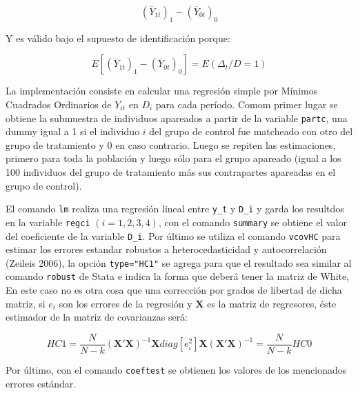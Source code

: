 \documentclass[]{article}
\begin{document}
\[ \left(\overline{Y}_{1t}\right)_{1}-\left(\overline{Y}_{0t}\right)_{0} \]

Y es válido bajo el supuesto de identificación porque:

\[ E\left[\left(\overline{Y}_{1t}\right)_{1}-\left(\overline{Y}_{0t}\right)_{0}\right]=E(\Delta_{t}/D=1) \]

La implementación consiste en calcular una regresión simple por Mínimos
Cuadrados Ordinarios de $Y_{it}$ en $D_{i}$ para cada período. Comom
primer lugar se obtiene la submuestra de individuos apareados a partir
de la variable \texttt{partc}, una dummy igual a 1 si el individuo $i$
del grupo de control fue matcheado con otro del grupo de tratamiento y 0
en caso contrario. Luego se repiten las estimaciones, primero para toda
la población y luego sólo para el grupo apareado (igual a los 100
individuos del grupo de tratamiento más sus contrapartes apareadas en el
grupo de control).

El comando \texttt{lm} realiza una regresión lineal entre \texttt{y\_t}
y \texttt{D\_i} y garda los resultdos en la variable \texttt{regci}
$(i=1, 2, 3, 4)$, con el comando \texttt{summary} se obtiene el valor
del coeficiente de la variable \texttt{D\_i}. Por último se utiliza el
comando \texttt{vcovHC} para estimar los errores estandar robustos a
heterocedasticidad y autocorrelación (Zeileis 2006), la opción
\texttt{type="HC1"} se agrega para que el resultado sea similar al
comando \texttt{robust} de Stata e indica la forma que deberá tener la
matriz de White, En este caso no es otra cosa que una corrección por
grados de libertad de dicha matriz, si $e_{i}$ son los errores de la
regresión y $\mathbf{X}$ es la matriz de regresores, éste estimador de
la matriz de covarianzas será:

\[ HC1=\frac{N}{N-k}(\mathbf{X}'\mathbf{X})^{-1}\mathbf{X}diag[e_{i}^{2}]\mathbf{X}(\mathbf{X}'\mathbf{X})^{-1}=\frac{N}{N-k}HC0 \]

Por último, con el comando \texttt{coeftest} se obtienen los valores de
los mencionados errores estándar.
\end{document}
